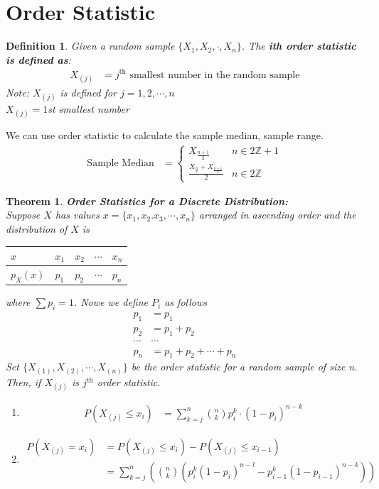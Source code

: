 \documentclass[11pt,oneside]{book}
\theoremstyle{break}
\theoremstyle{break}
\newtheorem{thm}{Theorem}[section]
\newtheorem{defn}{Definition}[corL]
\newcommand{\Z}{\mathbb{Z}}
\newcommand{\note}{\color{Purple}Note: \color{black}}
\begin{document}
\section[Order Statistic]{\color{DarkOrchid}Order Statistic}
\begin{defn}
Given a random sample $\{X_1,X_2,\cdot,X_n\}$. The \textbf{ith order statistic is defined as}:\begin{align*}
X_{(j)}&=j^{\text{th}} \text{ smallest number in the random sample}
\end{align*}
\note $X_{(j)}$ is defined for $j=1,2,\cdots, n$\\
\text{\qquad} $X_{(j)}=1$st smallest number 
\end{defn}
We can use order statistic to calculate the sample median, sample range.\\
\begin{align*}
\text{Sample Median}&=\begin{cases}
X_{\frac{n+1}{2}}&n\in 2\Z+1\\
\frac{X_{\frac{n}{2}}+X_{\frac{n+1}{2}}}{2}&n\in 2\Z
\end{cases}
\end{align*}
\begin{thm}
\textbf{Order Statistics for a Discrete Distribution:}\\
Suppose $X$ has values $x=\{x_1,x_2.x_3,\cdots,x_n\}$ arranged in ascending order and the distribution of $X$ is\begin{center}
\begin{tabular}{|l|l|l|l|l|}
\hline
$x$      & $x_1$ & $x_2$ & $\cdots$ & $x_n$ \\ \hline
$p_X(x)$ & $p_1$ & $p_2$ & $\cdots$ & $p_n$ \\ \hline
\end{tabular}
\end{center}
where $\sum p_i=1$. Nowe we define $P_i$ as follows\begin{align*}
p_1&=p_1\\
p_2&=p_1+p_2\\
\cdots & \cdots\\
p_n&=p_1+p_2+\cdots +p_n
\end{align*}
Set $\{X_{(1)}, X_{(2)},\cdots, X_{(n)}\}$ be the order statistic for a random sample of size n. Then, if $X_{(j)}$ is $j^{\text{th}}$ order statistic.
\begin{enumerate}
\item \begin{align*}
 P(X_{(j)}\leq x_i)&=\sum_{k=j}^n \binom nk p_i^k\cdot (1-p_i)^{n-k}
\end{align*} 
\item \begin{align*}
P(X_{(j)}=x_i)&=P(X_{(j)}\leq x_i)-P(X_{(j)}\leq x_{i-1})\\
&=\sum_{k=j}^n \left(\binom nk \left(p_i^k(1-p_i)^{n-l}-p_{i-1}^k(1-p_{i-1})^{n-k} \right) \right)
\end{align*}
\end{enumerate}
\end{thm}
\end{document}
